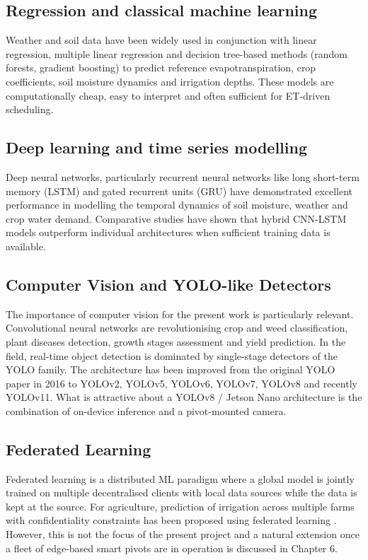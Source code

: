 \documentclass[12pt,a4paper]{report}
\begin{document}
\subsection{Regression and classical machine learning}

Weather and soil data have been widely used in conjunction with linear regression, multiple linear regression and decision tree-based methods (random forests, gradient boosting) to predict reference evapotranspiration, crop coefficients, soil moisture dynamics and irrigation depths. These models are computationally cheap, easy to interpret and often sufficient for ET-driven scheduling.

\subsection{Deep learning and time series modelling}

Deep neural networks, particularly recurrent neural networks like long short-term memory (LSTM) and gated recurrent units (GRU) have demonstrated excellent performance in modelling the temporal dynamics of soil moisture, weather and crop water demand. Comparative studies have shown that hybrid CNN-LSTM models outperform individual architectures when sufficient training data is available.

\subsection{Computer Vision and YOLO-like Detectors}

The importance of computer vision for the present work is particularly relevant. Convolutional neural networks are revolutionising crop and weed classification, plant diseases detection, growth stages assessment and yield prediction. In the field, real-time object detection is dominated by single-stage detectors of the YOLO family. The architecture has been improved from the original YOLO paper in 2016 to YOLOv2, YOLOv5, YOLOv6, YOLOv7, YOLOv8 and recently YOLOv11. What is attractive about a YOLOv8 / Jetson Nano architecture is the combination of on-device inference and a pivot-mounted camera.

\subsection{Federated Learning}

Federated learning is a distributed ML paradigm where a global model is jointly trained on multiple decentralised clients with local data sources while the data is kept at the source. For agriculture, prediction of irrigation across multiple farms with confidentiality constraints has been proposed using federated learning . However, this is not the focus of the present project and a natural extension once a fleet of edge-based smart pivots are in operation is discussed in Chapter 6.
\end{document}
